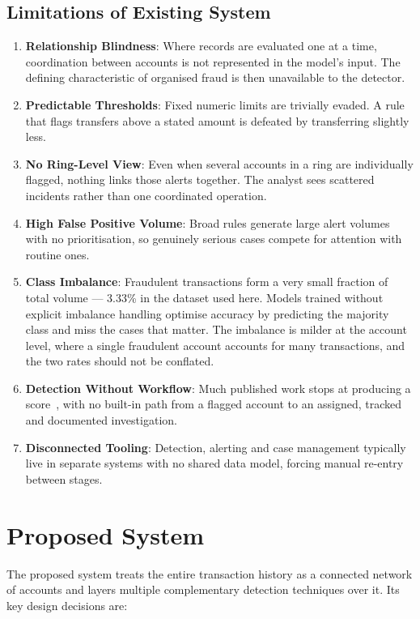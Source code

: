 \subsection{Limitations of Existing System}
\begin{enumerate}
  \item \textbf{Relationship Blindness}: Where records are evaluated one at a time, coordination between accounts is not represented in the model's input. The defining characteristic of organised fraud is then unavailable to the detector.
  \item \textbf{Predictable Thresholds}: Fixed numeric limits are trivially evaded. A rule that flags transfers above a stated amount is defeated by transferring slightly less.
  \item \textbf{No Ring-Level View}: Even when several accounts in a ring are individually flagged, nothing links those alerts together. The analyst sees scattered incidents rather than one coordinated operation.
  \item \textbf{High False Positive Volume}: Broad rules generate large alert volumes with no prioritisation, so genuinely serious cases compete for attention with routine ones.
  \item \textbf{Class Imbalance}: Fraudulent transactions form a very small fraction of total volume --- 3.33\% in the dataset used here. Models trained without explicit imbalance handling optimise accuracy by predicting the majority class and miss the cases that matter. The imbalance is milder at the account level, where a single fraudulent account accounts for many transactions, and the two rates should not be conflated.
  \item \textbf{Detection Without Workflow}: Much published work stops at producing a score~\cite{pourhabibi2020}, with no built-in path from a flagged account to an assigned, tracked and documented investigation.
  \item \textbf{Disconnected Tooling}: Detection, alerting and case management typically live in separate systems with no shared data model, forcing manual re-entry between stages.
\end{enumerate}

\section{Proposed System}
The proposed system treats the entire transaction history as a connected network of accounts and layers multiple complementary detection techniques over it. Its key design decisions are:

